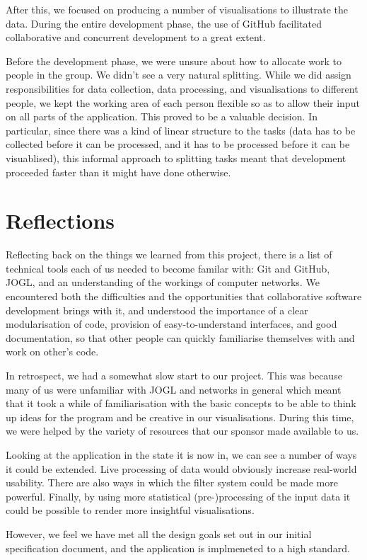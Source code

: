 \documentclass[12pt,a4paper]{article}
\begin{document}
		After this, we focused on producing a number of visualisations to illustrate the data. During the entire development phase, the use of GitHub facilitated collaborative and concurrent development to a great extent.
		
		Before the development phase, we were unsure about how to allocate work to people in the group. We didn't see a very natural splitting. While we did assign responsibilities for data collection, data processing, and visualisations to different people, we kept the working area of each person flexible so as to allow their input on all parts of the application. This proved to be a valuable decision. In particular, since there was a kind of linear structure to the tasks (data has to be collected before it can be processed, and it has to be processed before it can be visuablised), this informal approach to splitting tasks meant that development proceeded faster than it might have done otherwise.

    \section*{Reflections}

		Reflecting back on the things we learned from this project, there is a list of technical tools each of us needed to become familar with: Git and GitHub, JOGL, and an understanding of the workings of computer networks. We encountered both the difficulties and the opportunities that collaborative software development brings with it, and understood the importance of a clear modularisation of code, provision of easy-to-understand interfaces, and good documentation, so that other people can quickly familiarise themselves with and work on other's code. 
		
		In retrospect, we had a somewhat slow start to our project. This was because many of us were unfamiliar with JOGL and networks in general which meant that it took a while of familiarisation with the basic concepts to be able to think up ideas for the program and be creative in our visualisations. During this time, we were helped by the variety of resources that our sponsor made available to us.
		
        Looking at the application in the state it is now in, we can see a number of ways it could be extended. Live processing of data would obviously increase real-world usability. There are also ways in which the filter system could be made more powerful. Finally, by using more statistical (pre-)processing of the input data it could be possible to render more insightful visualisations.
	
        However, we feel we have met all the design goals set out in our initial specification document, and the application is implmeneted to a high standard.
	
\end{document}
